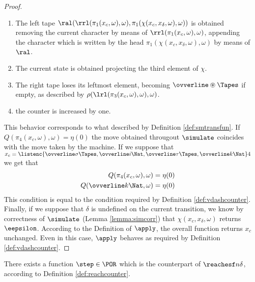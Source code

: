 \begin{conditional}{\notappendix}
\begin{proof}
\begin{enumerate}
         \item The left tape $\ral(\rrl(\pi_1(x_c,\omega),\omega),
        \pi_1(\chi(x_c, x_\delta, \omega),\omega))$
         is obtained removing the current character by means of
         $\rrl(\pi_1(x_c,\omega),\omega)$, appending
         the character which is written by the head
         $\pi_1(\chi(x_c, x_\delta, \omega),\omega)$ by means of $\ral$.
         \item The current state is obtained projecting
         the third element of $\chi$.
         \item The right tape loses its leftmost element, becoming
         $\ovverline \circledast \Tapes$ if empty, as described by
         \linebreak
         $\rho(\lrl(\pi_3(x_c,\omega),\omega), \omega)$.
         \item the counter is increased by one.
       \end{enumerate}
       This behavior corresponds to what described by
       Definition \ref{def:smtransfun}.
       If $Q(\pi_4(x_c, \omega),\omega)=\eta(0)$ the move obtained througout
       $\simulate$ coincides with the move taken by the machine.
       If we suppose that $x_c = \listenc
       {\ovverline \sigma \Tapes, \ovverline i \Nat,
        \ovverline \tau \Tapes, \ovverline k \Nat} 4$
        we get that
        \begin{align*}
          Q(\pi_4(x_c, \omega),\omega)&=\eta(0)\\
          Q(\ovverline k \Nat, \omega)&=\eta(0)
        \end{align*}
        This condition is equal to the condition required by Definition
        \ref{def:vdashcounter}.
        Finally, if we suppose that $\delta$ is undefined on the current transition,
        we know by correctness of $\simulate$ (Lemma \ref{lemma:simcorr}) that
        $\chi(x_c, x_\delta, \omega)$ returns $\eepsilon$. According to the
        Definition of $\apply$, the overall function returns $x_c$ unchanged.
        Even in this case, $\apply$ behaves as required by Definition
        \ref{def:vdashcounter}.
    \end{proof}

    \begin{lemma}[$\step \in \POR$]
      \label{lemma:stepinPOR}
      There exists a function $\step\in \POR$ which is the counterpart of
      $\reachesf n \delta$, according to Definition \ref{def:reachcounter}.
    \end{lemma}


\end{conditional}

